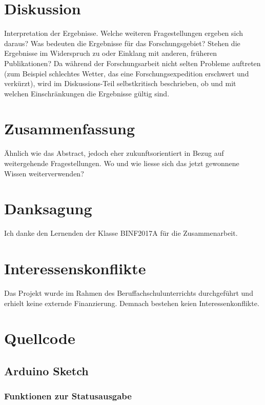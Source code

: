 \section{Diskussion}
Interpretation der Ergebnisse. Welche weiteren Fragestellungen ergeben sich daraus? 
Was bedeuten die Ergebnisse für das Forschungsgebiet? Stehen die Ergebnisse im Widerspruch 
zu oder Einklang mit anderen, früheren Publikationen? Da während der Forschungsarbeit nicht 
selten Probleme auftreten (zum Beispiel schlechtes Wetter, das eine Forschungsexpedition 
erschwert und verkürzt), wird im Diskussions-Teil selbstkritisch beschrieben, ob und mit 
welchen Einschränkungen die Ergebnisse gültig sind.

\section{Zusammenfassung}
Ähnlich wie das Abstract, jedoch eher zukunftsorientiert in Bezug auf weitergehende 
Fragestellungen. Wo und wie liesse sich das jetzt gewonnene Wissen weiterverwenden?

\section{Danksagung}
Ich danke den Lernenden der Klasse BINF2017A für die Zusammenarbeit.

\section{Interessenskonflikte}
Das Projekt wurde im Rahmen des Beruffachschulunterrichts durchgeführt und erhielt
keine externde Finanzierung. Demnach bestehen keien Interessenkonflikte.

\newpage
\printbibliography

\newpage
\appendix{}
\section{Quellcode}

\subsection{Arduino Sketch}

\subsubsection{Funktionen zur Statusausgabe}

